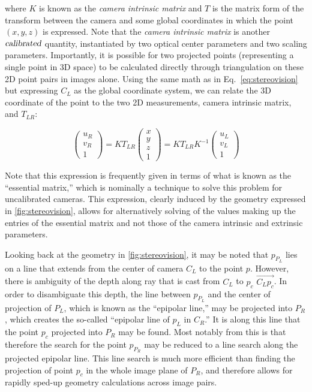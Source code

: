 \noindent where $K$ is known as the \textsl{camera intrinsic matrix} and $T$ is the matrix form of the transform between the camera and some global coordinates in which the point $(x, y, z)$ is expressed. Note that the \textsl{camera intrinsic matrix} is another $\textsl{calibrated}$ quantity, instantiated by two optical center parameters and two scaling parameters.
Importantly, it is possible for two projected points (representing a single point in 3D space) to be calculated directly through triangulation on these 2D point pairs in images alone. Using the same math as in Eq.\ \eqref{eq:stereovision} but expressing $C_L$ as the global coordinate system, we can relate the 3D coordinate of the point to the two 2D measurements, camera intrinsic matrix, and $T_{LR}$:

\begin{equation}
\begin{pmatrix}
u_R\\
v_R\\
1
\end{pmatrix}
= K T_{LR} \begin{pmatrix} x \\ y \\ z \\ 1\end{pmatrix}
= K T_{LR} K^{-1} \begin{pmatrix} u_L \\ v_L \\ 1 \end{pmatrix}
\end{equation}

Note that this expression is frequently given in terms of what is known as the ``essential matrix,'' which is nominally a technique to solve this problem for uncalibrated cameras. This expression, clearly induced by the geometry expressed in \cref{fig:stereovision}, allows for alternatively solving of the values making up the entries of the essential matrix and not those of the camera intrinsic and extrinsic parameters.

Looking back at the geometry in \cref{fig:stereovision}, it may be noted that $p_{P_L}$ lies on a line that extends from the center of camera $C_L$ to the point $p$. However, there is ambiguity of the depth along ray that is cast from $C_L$ to $p_c$ $\overrightarrow{C_L p_c}$. In order to disambiguate this depth, the line between $p_{P_L}$ and the center of projection of $P_L$, which is known as the ``epipolar line,''  may be projected into $P_R$, which creates the so-called ``epipolar line of $p_L$ in $C_R$.'' It is along this line that the point $p_c$ projected into $P_R$ may be found. Most notably from this is that therefore the search for the point $p_{P_R}$ may be reduced to a line search along the projected epipolar line. This line search is much more efficient than finding the projection of point $p_c$ in the whole image plane of $P_R$, and therefore allows for rapidly sped-up geometry calculations across image pairs.

